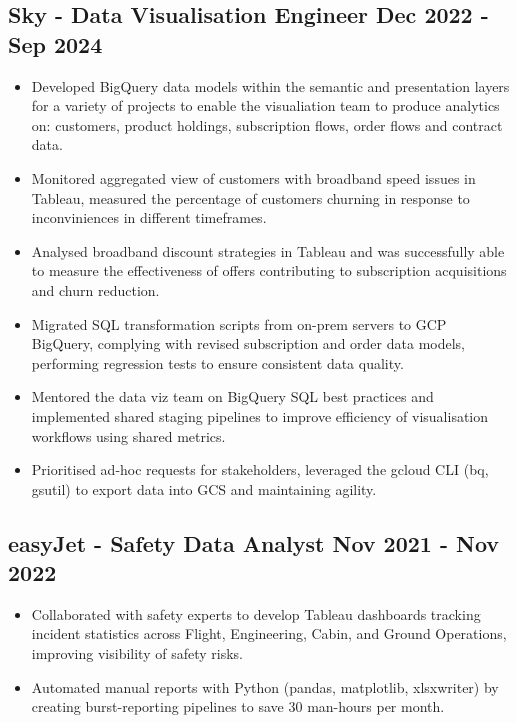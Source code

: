 \documentclass[a4paper, 10pt]{article}
\begin{document}
\subsection*{\textbf{Sky - Data Visualisation Engineer} \hfill  Dec 2022 - Sep 2024}
\begin{itemize}[noitemsep]
    \item Developed BigQuery data models within the semantic and presentation layers for a variety of projects to enable the visualiation team to produce analytics on: customers, product holdings, subscription flows, order flows and contract data.
    \item Monitored aggregated view of customers with broadband speed issues in Tableau, measured the percentage of customers churning in response to inconviniences in different timeframes.
    \item Analysed broadband discount strategies in Tableau and was successfully able to measure the effectiveness of offers contributing to subscription acquisitions and churn reduction.
    \item Migrated SQL transformation scripts from on-prem servers to GCP BigQuery, complying with revised subscription and order data models, performing regression tests to ensure consistent data quality.
    \item Mentored the data viz team on BigQuery SQL best practices and implemented shared staging pipelines to improve efficiency of visualisation workflows using shared metrics.
    \item Prioritised ad-hoc requests for stakeholders, leveraged the gcloud CLI (bq, gsutil) to export data into GCS and maintaining agility.
\end{itemize}

\subsection*{\textbf{easyJet - Safety Data Analyst} \hfill  Nov 2021 - Nov 2022}
\begin{itemize}[noitemsep]
    \item Collaborated with safety experts to develop Tableau dashboards tracking incident statistics across Flight, Engineering, Cabin, and Ground Operations, improving visibility of safety risks.
    \item Automated manual reports with Python (pandas, matplotlib, xlsxwriter) by creating burst-reporting pipelines to save 30 man-hours per month. 
\end{itemize}
\end{document}
